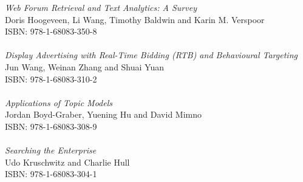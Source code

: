 \vspace{12pt}
\noindent \textit{Web Forum Retrieval and Text Analytics: A Survey}\\
Doris Hoogeveen, Li Wang, Timothy Baldwin and Karin M. Verspoor\\
ISBN: 978-1-68083-350-8\\
\\
\noindent \textit{Display Advertising with Real-Time Bidding (RTB) and Behavioural Targeting}\\
Jun Wang, Weinan Zhang and Shuai Yuan\\
ISBN: 978-1-68083-310-2\\
\\
\noindent \textit{Applications of Topic Models}\\
Jordan Boyd-Graber, Yuening Hu and David Mimno\\
ISBN: 978-1-68083-308-9\\
\\
\noindent \textit{Searching the Enterprise}\\
Udo Kruschwitz and Charlie Hull \\
ISBN: 978-1-68083-304-1